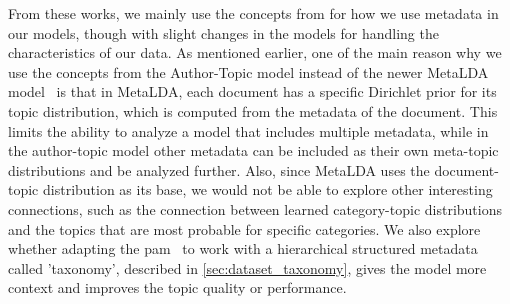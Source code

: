 From these works, we mainly use the concepts from \citet{author_topic_2012} for how we use metadata in our models, though with slight changes in the models for handling the characteristics of our data.
As mentioned earlier, one of the main reason why we use the concepts from the Author-Topic model instead of the newer MetaLDA model~\cite{MetaLDA2017} is that in MetaLDA, each document has a specific Dirichlet prior for its topic distribution, which is computed from the metadata of the document.
This limits the ability to analyze a model that includes multiple metadata, while in the author-topic model other metadata can be included as their own meta-topic distributions and be analyzed further.
Also, since MetaLDA uses the document-topic distribution as its base, we would not be able to explore other interesting connections, such as the connection between learned category-topic distributions and the topics that are most probable for specific categories.
We also explore whether adapting the \gls{pam}~\cite{li2006pachinko} to work with a hierarchical structured metadata called 'taxonomy', described in \autoref{sec:dataset_taxonomy}, gives the model more context and improves the topic quality or performance.
